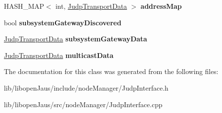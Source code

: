 \begin{DoxyCompactItemize}
\item 
\hypertarget{class_judp_interface_a14aaa10b24e3a161308aba3984075995}{\-H\-A\-S\-H\-\_\-\-M\-A\-P$<$ int, \hyperlink{struct_judp_transport_data}{\-Judp\-Transport\-Data} $>$ {\bfseries address\-Map}}\label{class_judp_interface_a14aaa10b24e3a161308aba3984075995}

\item 
\hypertarget{class_judp_interface_abb6d683ceabe7b63ec3403feafc70c81}{bool {\bfseries subsystem\-Gateway\-Discovered}}\label{class_judp_interface_abb6d683ceabe7b63ec3403feafc70c81}

\item 
\hypertarget{class_judp_interface_a4d0b8fd130f5fadbf5e219795e24b30b}{\hyperlink{struct_judp_transport_data}{\-Judp\-Transport\-Data} {\bfseries subsystem\-Gateway\-Data}}\label{class_judp_interface_a4d0b8fd130f5fadbf5e219795e24b30b}

\item 
\hypertarget{class_judp_interface_a2ef807948294464fb55958777e7dc4fa}{\hyperlink{struct_judp_transport_data}{\-Judp\-Transport\-Data} {\bfseries multicast\-Data}}\label{class_judp_interface_a2ef807948294464fb55958777e7dc4fa}

\end{DoxyCompactItemize}


\-The documentation for this class was generated from the following files\-:\begin{DoxyCompactItemize}
\item 
lib/libopen\-Jaus/include/node\-Manager/\-Judp\-Interface.\-h\item 
lib/libopen\-Jaus/src/node\-Manager/\-Judp\-Interface.\-cpp\end{DoxyCompactItemize}
